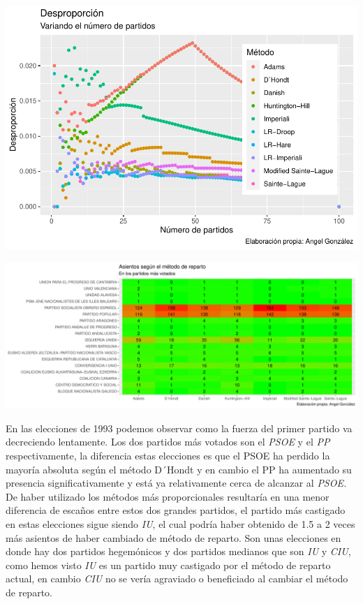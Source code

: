 \documentclass[12pt,a4paper,]{book}
\numberwithin{dummy}{section}
\theoremstyle{ocrenumbox}
\theoremstyle{blacknumex}
\theoremstyle{blacknumbox}
\theoremstyle{ocrenum}
\theoremstyle{ocrenum}
\begin{document}
\begin{center}\includegraphics[width=0.95\linewidth]{figurasR/unnamed-chunk-56-1} \end{center}

\begin{center}\includegraphics[width=0.95\linewidth]{figurasR/unnamed-chunk-56-2} \end{center}

En las elecciones de 1993 podemos observar como la fuerza del primer
partido va decreciendo lentamente. Los dos partidos más votados son el
\emph{PSOE} y el \emph{PP} respectivamente, la diferencia estas
elecciones es que el PSOE ha perdido la mayoría absoluta según el método
D´Hondt y en cambio el PP ha aumentado su presencia significativamente y
está ya relativamente cerca de alcanzar al \emph{PSOE.} De haber
utilizado los métodos más proporcionales resultaría en una menor
diferencia de escaños entre estos dos grandes partidos, el partido más
castigado en estas elecciones sigue siendo \emph{IU}, el cual podría
haber obtenido de 1.5 a 2 veces más asientos de haber cambiado de método
de reparto. Son unas elecciones en donde hay dos partidos hegemónicos y
dos partidos medianos que son \emph{IU} y \emph{CIU}, como hemos visto
\emph{IU} es un partido muy castigado por el método de reparto actual,
en cambio \emph{CIU} no se vería agraviado o beneficiado al cambiar el
método de reparto.
\end{document}
